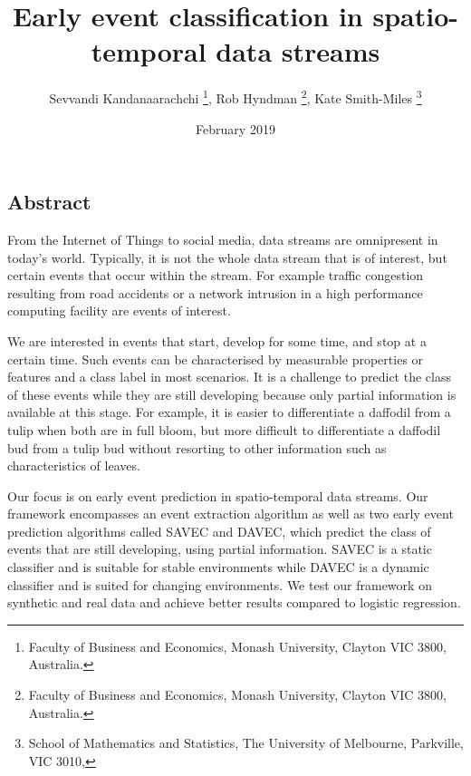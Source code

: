 \documentclass{article}
\begin{document}
\title{Early event classification in spatio-temporal data streams }
\author{Sevvandi Kandanaarachchi \thanks{Faculty of Business and Economics, Monash University, Clayton VIC 3800, Australia. }, Rob Hyndman \thanks{Faculty of Business and Economics, Monash University, Clayton VIC 3800, Australia. }, Kate Smith-Miles \thanks{School of Mathematics and Statistics, The University of Melbourne, Parkville, VIC 3010, } }
\date{February 2019}
\maketitle
\begin{centering}
\section*{Abstract}
\end{centering}


From the Internet of Things  to social media,  data streams are omnipresent in today's world. Typically, it is not the whole data stream that is of interest, but certain events that occur within the stream. For example traffic congestion resulting from road accidents or a network intrusion in a  high performance computing facility are events of interest.  

We are interested in events that start, develop for some time, and stop at a certain time. Such events can be characterised by measurable properties or features and a class label in most scenarios. It is a challenge to predict the class of these events while they are still developing because only partial information is available at this stage. For example, it is easier to differentiate a daffodil from a tulip when both are in full bloom, but more difficult to differentiate a daffodil bud from a tulip bud without resorting to other information such as characteristics of leaves. 

Our focus is on early event prediction in spatio-temporal data streams. Our framework encompasses an event extraction algorithm as well as two early event prediction algorithms called SAVEC and DAVEC, which predict the class of events that are still developing, using partial information. SAVEC is a static classifier and is suitable for stable environments while DAVEC is a dynamic classifier and is suited for changing environments. We test our framework on synthetic and real data and achieve better results compared to logistic regression.
 
\end{document}
